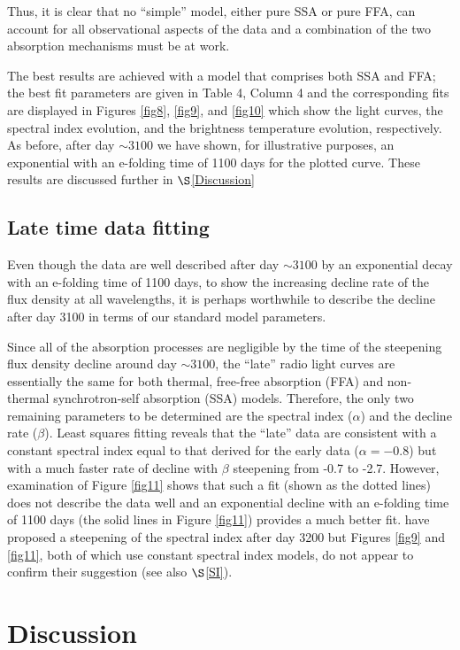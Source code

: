 \documentclass[12pt,preprint]{aastex}
\begin{document}
Thus, it is clear that no ``simple''  model, either pure SSA or pure FFA, can account for all observational
aspects of the data and a combination of the two absorption mechanisms must be at work.

The best results are achieved with a model that comprises both SSA and FFA; the best fit parameters are given in Table 4, Column 4 and the corresponding fits are displayed in Figures \ref{fig8}, \ref{fig9}, and \ref{fig10} which show the light curves, the spectral index evolution, and the brightness temperature evolution, respectively. As before, after day $\sim3100$ we have shown, for illustrative purposes, an exponential with an e-folding time of 1100 days for the plotted curve. These results are discussed further in $\S$\ref{Discussion}

\subsection{Late time data fitting}

Even though the data are well described after day $\sim3100$ by an exponential decay with an e-folding time of 1100 days, to show the increasing decline rate of the flux density at all wavelengths, it is perhaps worthwhile to describe the decline after day 3100 in terms of our standard model parameters.

Since all of the absorption processes are negligible by the time
of the steepening flux density decline around day $\sim3100$, the ``late'' radio
light curves are essentially the same for both thermal, free-free absorption (FFA) and 
non-thermal synchrotron-self absorption (SSA) models. Therefore, the only two remaining parameters to be determined are the spectral index ($\alpha$) and the decline rate ($\beta$). Least squares fitting reveals that the ``late'' data are consistent with a constant spectral index equal to that derived for
the early data ($\alpha = -0.8$) but with a much faster rate of decline with $\beta$
steepening from -0.7 to -2.7. However, examination of Figure \ref{fig11} shows that such a fit (shown as the dotted lines) does not describe the data well and an exponential decline with an e-folding time of 1100 days (the solid lines in Figure \ref{fig11}) provides a much better fit. \cite{Chandra04} have proposed a steepening of the spectral index after day 3200 but Figures \ref{fig9} and \ref{fig11}, both of which use constant spectral index models, do not appear to confirm their suggestion (see also $\S$\ref{SI}).

\section{Discussion \label{Discussion}}
\end{document}
